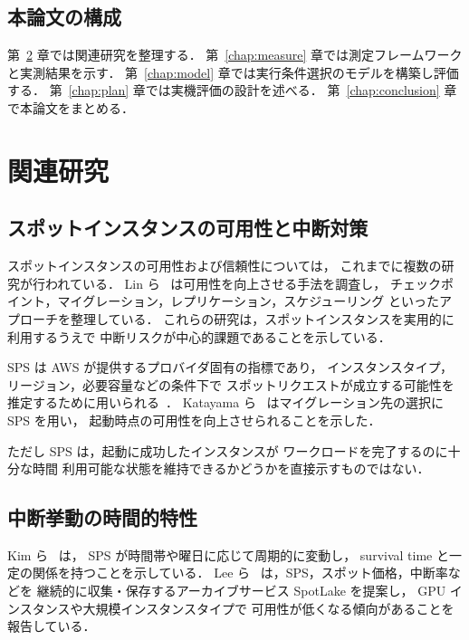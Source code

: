 \documentclass[11pt,a4paper]{ltjsreport}
\begin{document}
\section{本論文の構成}

第~\ref{chap:related} 章では関連研究を整理する．
第~\ref{chap:measure} 章では測定フレームワークと実測結果を示す．
第~\ref{chap:model} 章では実行条件選択のモデルを構築し評価する．
第~\ref{chap:plan} 章では実機評価の設計を述べる．
第~\ref{chap:conclusion} 章で本論文をまとめる．

\chapter{関連研究}
\label{chap:related}

\section{スポットインスタンスの可用性と中断対策}

スポットインスタンスの可用性および信頼性については，
これまでに複数の研究が行われている．
Lin ら~\cite{Lin2022Survey} は可用性を向上させる手法を調査し，
チェックポイント，マイグレーション，レプリケーション，スケジューリング
といったアプローチを整理している．
これらの研究は，スポットインスタンスを実用的に利用するうえで
中断リスクが中心的課題であることを示している．

SPS は AWS が提供するプロバイダ固有の指標であり，
インスタンスタイプ，リージョン，必要容量などの条件下で
スポットリクエストが成立する可能性を推定するために用いられる~\cite{AWSSPS}．
Katayama ら~\cite{Katayama2022} はマイグレーション先の選択に SPS を用い，
起動時点の可用性を向上させられることを示した．

ただし SPS は，起動に成功したインスタンスが
ワークロードを完了するのに十分な時間
利用可能な状態を維持できるかどうかを直接示すものではない．

\section{中断挙動の時間的特性}

Kim ら~\cite{Kim2024SpotInterruption} は，
SPS が時間帯や曜日に応じて周期的に変動し，
survival time と一定の関係を持つことを示している．
Lee ら~\cite{Lee2022SpotLake} は，SPS，スポット価格，中断率などを
継続的に収集・保存するアーカイブサービス SpotLake を提案し，
GPU インスタンスや大規模インスタンスタイプで
可用性が低くなる傾向があることを報告している．
\end{document}

